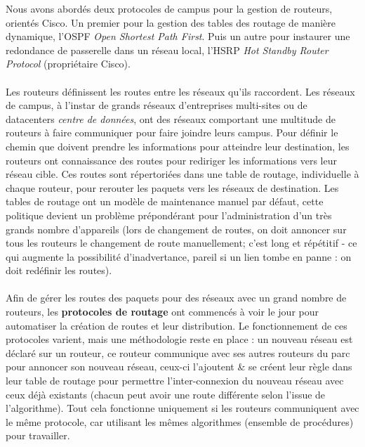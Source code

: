 Nous avons abordés deux protocoles de campus pour la gestion de routeurs, orientés Cisco. Un premier pour la gestion des tables des routage de manière dynamique, l'OSPF \textit{Open Shortest Path First}. Puis un autre pour instaurer une redondance de passerelle dans un réseau local, l'HSRP \textit{Hot Standby Router Protocol} (propriétaire Cisco).
\\ \\
Les routeurs définissent les routes entre les réseaux qu'ils raccordent. Les réseaux de campus, à l'instar de grands réseaux d'entreprises multi-sites ou de datacenters \textit{centre de données}, ont des réseaux comportant une multitude de routeurs à faire communiquer pour faire joindre leurs campus. Pour définir le chemin que doivent prendre les informations pour atteindre leur destination, les routeurs ont connaissance des routes pour rediriger les informations vers leur réseau cible. Ces routes sont répertoriées dans une table de routage, individuelle à chaque routeur, pour rerouter les paquets vers les réseaux de destination. Les tables de routage ont un modèle de maintenance manuel par défaut, cette politique devient un problème prépondérant pour l'administration d'un très grands nombre d'appareils (lors de changement de routes, on doit annoncer sur tous les routeurs le changement de route manuellement; c'est long et répétitif - ce qui augmente la possibilité d'inadvertance, pareil si un lien tombe en panne : on doit redéfinir les routes).
\\ \\
Afin de gérer les routes des paquets pour des réseaux avec un grand nombre de routeurs, les \textbf{protocoles de routage} ont commencés à voir le jour pour automatiser la création de routes et leur distribution. Le fonctionnement de ces protocoles varient, mais une méthodologie reste en place : un nouveau réseau est déclaré sur un routeur, ce routeur communique avec ses autres routeurs du parc pour annoncer son nouveau réseau, ceux-ci l'ajoutent \& se créent leur règle dans leur table de routage pour permettre l'inter-connexion du nouveau réseau avec ceux déjà existants (chacun peut avoir une route différente selon l'issue de l'algorithme). Tout cela fonctionne uniquement si les routeurs communiquent avec le même protocole, car utilisant les mêmes algorithmes (ensemble de procédures) pour travailler.
\\ \\
